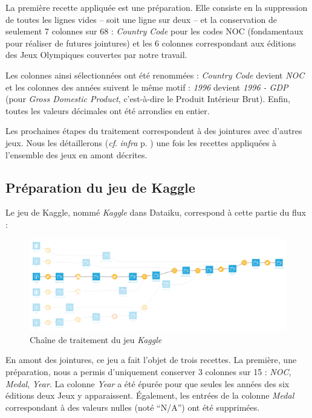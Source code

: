 \documentclass[hidelinks, 12pt]{report}
\begin{document}
La première recette appliquée est une préparation. Elle consiste en la suppression de toutes les lignes vides -- soit une ligne sur deux -- et la conservation de seulement 7 colonnes sur 68 : \textit{Country Code} pour les codes NOC (fondamentaux pour réaliser de futures jointures) et les 6 colonnes correspondant aux éditions des Jeux Olympiques couvertes par notre travail.

Les colonnes ainsi sélectionnées ont été renommées : \textit{Country Code} devient \textit{NOC} et les colonnes des années suivent le même motif : \textit{1996} devient \textit{1996 - GDP} (pour \textit{Gross Domestic Product}, c'est-à-dire le Produit Intérieur Brut). Enfin, toutes les valeurs décimales ont été arrondies en entier.

Les prochaines étapes du traitement correspondent à des jointures avec d'autres jeux. Nous les détaillerons (\textit{cf}. \textit{infra} p. \pageref{join}) une fois les recettes appliquées à l'ensemble des jeux en amont décrites.





%





\subsection{Préparation du jeu de Kaggle}

Le jeu de Kaggle, nommé \textit{Kaggle} dans Dataiku, correspond à cette partie du flux :

\begin{center}
	\begin{figure}[H]
		\setlength{\belowcaptionskip}{-35pt}
		\includegraphics[scale=0.35]{images/flow-medals-kaggle.png}
		\caption{Chaîne de traitement du jeu \textit{Kaggle}}
	\end{figure}
\end{center}

En amont des jointures, ce jeu a fait l'objet de trois recettes. La première, une préparation, nous a permis d'uniquement conserver 3 colonnes sur 15 : \textit{NOC}, \textit{Medal}, \textit{Year}. La colonne \textit{Year} a été épurée pour que seules les années des six éditions deux Jeux y apparaissent. Également, les entrées de la colonne \textit{Medal} correspondant à des valeurs nulles (noté \enquote{N/A}) ont été supprimées.
\end{document}
